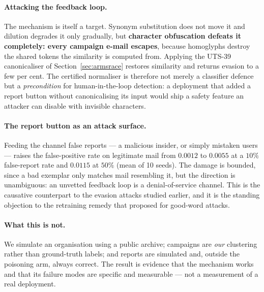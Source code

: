 \documentclass[11pt]{article}
\begin{document}
\paragraph{Attacking the feedback loop.} The mechanism is itself a target. Synonym substitution does
not move it and dilution degrades it only gradually, but \textbf{character obfuscation defeats it
completely: every campaign e-mail escapes}, because homoglyphs destroy the shared tokens the
similarity is computed from. Applying the UTS-39 canonicaliser of Section~\ref{sec:armsrace} restores
similarity and returns evasion to a few per cent. The certified normaliser is therefore not merely a
classifier defence but a \emph{precondition} for human-in-the-loop detection: a deployment that added
a report button without canonicalising its input would ship a safety feature an attacker can disable
with invisible characters.

\paragraph{The report button as an attack surface.} Feeding the channel false reports --- a malicious
insider, or simply mistaken users --- raises the false-positive rate on legitimate mail from $0.0012$
to $0.0055$ at a $10\%$ false-report rate and $0.0115$ at $50\%$ (mean of 10 seeds). The damage is
bounded, since a bad exemplar only matches mail resembling it, but the direction is unambiguous: an
unvetted feedback loop is a denial-of-service channel. This is the causative counterpart to the
evasion attacks studied earlier, and it is the standing objection to the retraining remedy that
\citet{lowd2005good} proposed for good-word attacks.

\paragraph{What this is not.} We simulate an organisation using a public archive; campaigns are
\emph{our} clustering rather than ground-truth labels; and reports are simulated and, outside the
poisoning arm, always correct. The result is evidence that the mechanism works and that its failure
modes are specific and measurable --- not a measurement of a real deployment.
\end{document}
